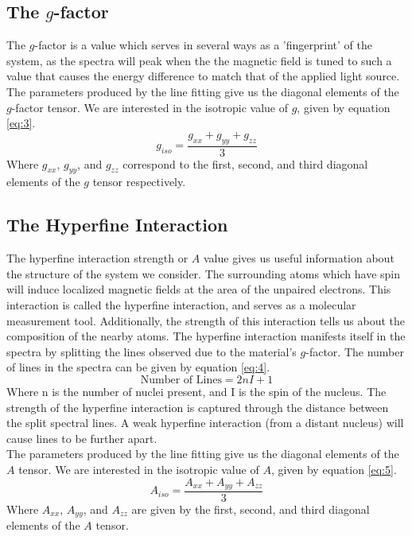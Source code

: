 \documentclass[twocolumn]{article}
\begin{document}
\subsection{The $g$-factor}
The $g$-factor is a value which serves in several ways as a 'fingerprint' of the system, as the spectra will peak when the the magnetic field is tuned to such a value that causes the energy difference to match that of the applied light source.\\
\indent
The parameters produced by the line fitting give us the diagonal elements of the $g$-factor tensor. We are interested in the isotropic value of $g$, given by equation \ref{eq:3}.
\begin{equation}
g_{iso}=\frac{g_{xx}+g_{yy}+g_{zz}}{3}
\label{eq:3}
\end{equation}
Where $g_{xx}$, $g_{yy}$, and $g_{zz}$ correspond to the first, second, and third diagonal elements of the $g$ tensor respectively. 
\\
\subsection{The Hyperfine Interaction}
The hyperfine interaction strength or $A$ value gives us useful information about the structure of the system we consider. The surrounding atoms which have spin will induce localized magnetic fields at the area of the unpaired electrons. This interaction is called the hyperfine interaction, and serves as a molecular measurement tool. Additionally, the strength of this interaction tells us about the composition of the nearby atoms. The hyperfine interaction manifests itself in the spectra by splitting the lines observed due to the material's $g$-factor. The number of lines in the spectra can be given by equation \ref{eq:4}.
\begin{equation}
\text{Number of Lines} = 2nI+1
\label{eq:4}
\end{equation}
Where n is the number of nuclei present, and I is the spin of the nucleus. The strength of the hyperfine interaction is captured through the distance between the split spectral lines. A weak hyperfine interaction (from a distant nucleus) will cause lines to be further apart. \\
\indent
The parameters produced by the line fitting give us the diagonal elements of the $A$ tensor. We are interested in the isotropic value of $A$, given by equation \ref{eq:5}.
\begin{equation}
A_{iso}=\frac{A_{xx}+A_{yy}+A_{zz}}{3}
\label{eq:5}
\end{equation}
Where $A_{xx}$, $A_{yy}$, and $A_{zz}$ are given by the first, second, and third diagonal elements of the $A$ tensor. 
\end{document}
